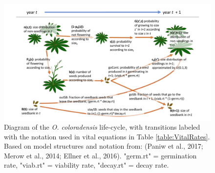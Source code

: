\documentclass[12pt, letterpaper]{article}
\begin{document}
\begin{figure}[ht!]
    \centering
    \includegraphics[width=1\textwidth]{figures/COBP_lifecyclediagram_new.pdf}
    \caption{\internallinenumbers
    Diagram of the \textit{O. coloradensis} life-cycle, with transitions labeled with the notation used in vital equations in Table \ref{table:VitalRates}. Based on model structures and notation from: (Paniw et al., 2017; Merow et al., 2014; Ellner et al., 2016). "germ.rt" = germination rate, "viab.rt" = viability rate, "decay.rt" = decay rate.}
 \label{fig:lifecycle}
\end{figure}
\end{document}
